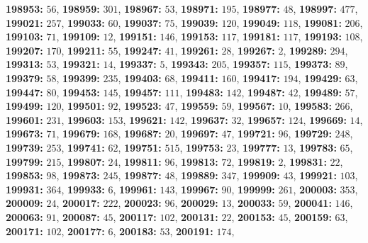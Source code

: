 \textsf{\bfseries 198953:} $56$, \textsf{\bfseries 198959:} $301$, \textsf{\bfseries 198967:} $53$, \textsf{\bfseries 198971:} $195$, \textsf{\bfseries 198977:} $48$, \textsf{\bfseries 198997:} $477$, \textsf{\bfseries 199021:} $257$, \textsf{\bfseries 199033:} $60$, \textsf{\bfseries 199037:} $75$, \textsf{\bfseries 199039:} $120$, \textsf{\bfseries 199049:} $118$, \textsf{\bfseries 199081:} $206$, \textsf{\bfseries 199103:} $71$, \textsf{\bfseries 199109:} $12$, \textsf{\bfseries 199151:} $146$, \textsf{\bfseries 199153:} $117$, \textsf{\bfseries 199181:} $117$, \textsf{\bfseries 199193:} $108$, \textsf{\bfseries 199207:} $170$, \textsf{\bfseries 199211:} $55$, \textsf{\bfseries 199247:} $41$, \textsf{\bfseries 199261:} $28$, \textsf{\bfseries 199267:} $2$, \textsf{\bfseries 199289:} $294$, \textsf{\bfseries 199313:} $53$, \textsf{\bfseries 199321:} $14$, \textsf{\bfseries 199337:} $5$, \textsf{\bfseries 199343:} $205$, \textsf{\bfseries 199357:} $115$, \textsf{\bfseries 199373:} $89$, \textsf{\bfseries 199379:} $58$, \textsf{\bfseries 199399:} $235$, \textsf{\bfseries 199403:} $68$, \textsf{\bfseries 199411:} $160$, \textsf{\bfseries 199417:} $194$, \textsf{\bfseries 199429:} $63$, \textsf{\bfseries 199447:} $80$, \textsf{\bfseries 199453:} $145$, \textsf{\bfseries 199457:} $111$, \textsf{\bfseries 199483:} $142$, \textsf{\bfseries 199487:} $42$, \textsf{\bfseries 199489:} $57$, \textsf{\bfseries 199499:} $120$, \textsf{\bfseries 199501:} $92$, \textsf{\bfseries 199523:} $47$, \textsf{\bfseries 199559:} $59$, \textsf{\bfseries 199567:} $10$, \textsf{\bfseries 199583:} $266$, \textsf{\bfseries 199601:} $231$, \textsf{\bfseries 199603:} $153$, \textsf{\bfseries 199621:} $142$, \textsf{\bfseries 199637:} $32$, \textsf{\bfseries 199657:} $124$, \textsf{\bfseries 199669:} $14$, \textsf{\bfseries 199673:} $71$, \textsf{\bfseries 199679:} $168$, \textsf{\bfseries 199687:} $20$, \textsf{\bfseries 199697:} $47$, \textsf{\bfseries 199721:} $96$, \textsf{\bfseries 199729:} $248$, \textsf{\bfseries 199739:} $253$, \textsf{\bfseries 199741:} $62$, \textsf{\bfseries 199751:} $515$, \textsf{\bfseries 199753:} $23$, \textsf{\bfseries 199777:} $13$, \textsf{\bfseries 199783:} $65$, \textsf{\bfseries 199799:} $215$, \textsf{\bfseries 199807:} $24$, \textsf{\bfseries 199811:} $96$, \textsf{\bfseries 199813:} $72$, \textsf{\bfseries 199819:} $2$, \textsf{\bfseries 199831:} $22$, \textsf{\bfseries 199853:} $98$, \textsf{\bfseries 199873:} $245$, \textsf{\bfseries 199877:} $48$, \textsf{\bfseries 199889:} $347$, \textsf{\bfseries 199909:} $43$, \textsf{\bfseries 199921:} $103$, \textsf{\bfseries 199931:} $364$, \textsf{\bfseries 199933:} $6$, \textsf{\bfseries 199961:} $143$, \textsf{\bfseries 199967:} $90$, \textsf{\bfseries 199999:} $261$, \textsf{\bfseries 200003:} $353$, \textsf{\bfseries 200009:} $24$, \textsf{\bfseries 200017:} $222$, \textsf{\bfseries 200023:} $96$, \textsf{\bfseries 200029:} $13$, \textsf{\bfseries 200033:} $59$, \textsf{\bfseries 200041:} $146$, \textsf{\bfseries 200063:} $91$, \textsf{\bfseries 200087:} $45$, \textsf{\bfseries 200117:} $102$, \textsf{\bfseries 200131:} $22$, \textsf{\bfseries 200153:} $45$, \textsf{\bfseries 200159:} $63$, \textsf{\bfseries 200171:} $102$, \textsf{\bfseries 200177:} $6$, \textsf{\bfseries 200183:} $53$, \textsf{\bfseries 200191:} $174$, 
